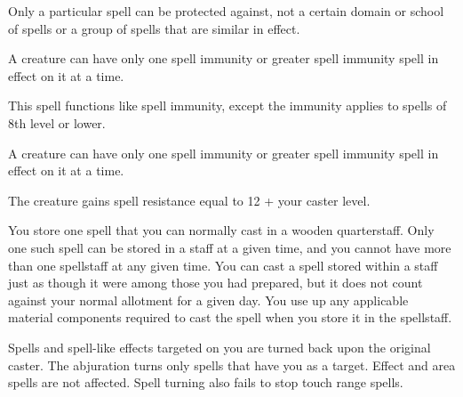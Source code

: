 \begin{multicols}{2}
\begin{small}
\smallskip\noindent Only a particular spell can be protected against, not a certain domain or school of spells or a group of spells that are similar in effect. 

\smallskip\noindent A creature can have only one spell immunity or greater spell immunity spell in effect on it at a time.

\noindent This spell functions like spell immunity, except the immunity applies to spells of 8th level or lower.

\smallskip\noindent A creature can have only one spell immunity or greater spell immunity spell in effect on it at a time.

\noindent The creature gains spell resistance equal to 12 + your caster level.

\noindent You store one spell that you can normally cast in a wooden quarterstaff. Only one such spell can be stored in a staff at a given time, and you cannot have more than one spellstaff at any given time. You can cast a spell stored within a staff just as though it were among those you had prepared, but it does not count against your normal allotment for a given day. You use up any applicable material components required to cast the spell when you store it in the spellstaff.


\noindent Spells and spell-like effects targeted on you are turned back upon the original caster. The abjuration turns only spells that have you as a target. Effect and area spells are not affected. Spell turning also fails to stop touch range spells. 


\end{small}
\end{multicols}
